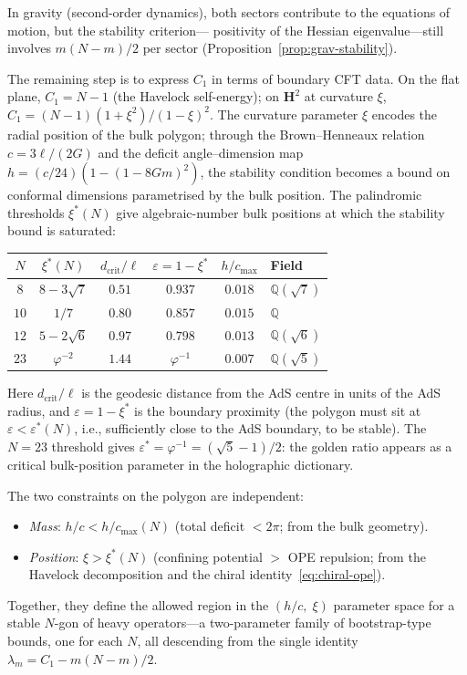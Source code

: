 In gravity (second-order dynamics), both sectors contribute
to the equations of motion, but the stability criterion---
positivity of the Hessian eigenvalue---still involves
$m(N{-}m)/2$ per sector
(Proposition~\ref{prop:grav-stability}).

The remaining step is to express $C_1$ in terms of boundary
CFT data.
On the flat plane, $C_1 = N{-}1$ (the Havelock self-energy);
on $\mathbf{H}^2$ at curvature $\xi$,
$C_1 = (N{-}1)(1{+}\xi^2)/(1{-}\xi)^2$.
The curvature parameter $\xi$ encodes the radial
position of the bulk polygon; through the Brown--Henneaux
relation $c = 3\ell/(2G)$ and the deficit angle--dimension
map $h = (c/24)(1{-}(1{-}8Gm)^2)$, the stability condition
becomes a bound on conformal dimensions parametrised by the
bulk position.
The palindromic thresholds $\xi^*(N)$ give algebraic-number
bulk positions at which the stability bound is saturated:
\begin{center}
\small
\begin{tabular}{cccccl}
\toprule
$N$ & $\xi^*(N)$ & $d_{\mathrm{crit}}/\ell$ &
  $\varepsilon = 1{-}\xi^*$ & $h/c_{\max}$ & Field \\
\midrule
$8$  & $8{-}3\sqrt{7}$            & $0.51$ & $0.937$ & $0.018$
  & $\mathbb{Q}(\sqrt{7})$ \\
$10$ & $1/7$                       & $0.80$ & $0.857$ & $0.015$
  & $\mathbb{Q}$ \\
$12$ & $5{-}2\sqrt{6}$            & $0.97$ & $0.798$ & $0.013$
  & $\mathbb{Q}(\sqrt{6})$ \\ [2pt]
$23$ & $\varphi^{-2}$              & $1.44$ & $\varphi^{-1}$ & $0.007$
  & $\mathbb{Q}(\sqrt{5})$ \\
\bottomrule
\end{tabular}
\end{center}
Here $d_{\mathrm{crit}}/\ell$ is the geodesic distance from
the AdS centre in units of the AdS radius, and
$\varepsilon = 1 - \xi^*$ is the boundary proximity
(the polygon must sit at $\varepsilon < \varepsilon^*(N)$,
i.e., sufficiently close to the AdS boundary, to be stable).
The $N = 23$ threshold gives
$\varepsilon^* = \varphi^{-1} = (\sqrt{5}{-}1)/2$: the golden
ratio appears as a critical bulk-position parameter in the
holographic dictionary.

The two constraints on the polygon are independent:
\begin{itemize}
  \item \emph{Mass}: $h/c < h/c_{\max}(N)$
    (total deficit $< 2\pi$; from the bulk geometry).
  \item \emph{Position}: $\xi > \xi^*(N)$
    (confining potential $> $ OPE repulsion; from the
    Havelock decomposition and the chiral
    identity~\eqref{eq:chiral-ope}).
\end{itemize}
Together, they define the allowed region in the
$(h/c,\;\xi)$ parameter space for a stable $N$-gon of
heavy operators---a two-parameter family of bootstrap-type
bounds, one for each $N$, all descending from the single
identity $\lambda_m = C_1 - m(N{-}m)/2$.

